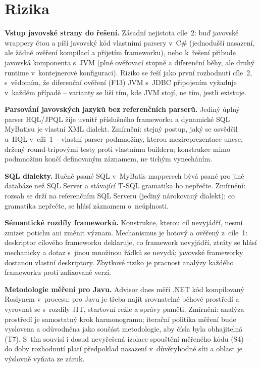 \documentclass{article}
\begin{document}
\section{Rizika}\label{sec:rizika}

\textbf{Vstup javovské strany do řešení.} Zásadní nejistota cíle~2: buď javovské wrappery čtou a píší javovský kód vlastními parsery v~C\# (jednodušší nasazení, ale žádné ověření kompilací a přijetím frameworku), nebo k~řešení přibude javovská komponenta s~JVM (plné ověřovací stupně a diferenční běhy, ale druhý runtime v~kontejnerové konfiguraci). Riziko se řeší jako první rozhodnutí cíle~2, s~vědomím, že diferenční ověření (F13) JVM s~JDBC připojením vyžaduje v~každém případě -- varianty se liší tím, kde JVM stojí, ne tím, jestli existuje.

\textbf{Parsování javovských jazyků bez referenčních parserů.} Jediný úplný parser HQL/JPQL žije uvnitř příslušného frameworku a dynamické SQL MyBatisu je vlastní XML dialekt. Zmírnění: stejný postup, jaký se osvědčil u~HQL v~cíli~1 -- vlastní parser podmnožiny, kterou mezireprezentace unese, držený round-tripovými testy proti vlastnímu builderu; konstrukce mimo podmnožinu končí definovaným záznamem, ne tichým vynecháním.

\textbf{SQL dialekty.} Ručně psané SQL v~MyBatis mapperech bývá psané pro jiné databáze než SQL Server a stávající T-SQL gramatika ho nepřečte. Zmírnění: rozsah se drží na referenčním SQL Serveru (jediný nárokovaný dialekt); co gramatika nepřečte, se hlásí záznamem o~neúplnosti.

\textbf{Sémantické rozdíly frameworků.} Konstrukce, kterou cíl nevyjádří, nesmí zmizet potichu ani změnit význam. Mechanismus je hotový a ověřený z~cíle~1: deskriptor cílového frameworku deklaruje, co framework nevyjádří, ztráty se hlásí mechanicky a dotaz s~jinou množinou řádků se nevydá; javovské frameworky dostanou vlastní deskriptory. Zbytkové riziko je pracnost analýzy každého frameworku proti zafixované verzi.

\textbf{Metodologie měření pro Javu.} Advisor dnes měří .NET kód kompilovaný Roslynem v~procesu; pro Javu je třeba najít srovnatelné běhové prostředí a vyrovnat se s~rozdíly JIT, startovní režie a správy paměti. Zmírnění: analýza prostředí je samostatný krok harmonogramu; iterační politika měření bude vyslovena a odůvodněna jako součást metodologie, aby čísla byla obhajitelná (T7). S~tím souvisí i dosud nevyřešená izolace spouštění měřeného kódu (S4) -- do doby rozhodnutí platí předpoklad nasazení v~důvěryhodné síti a oblast je výslovně vyňata ze záruk.
\end{document}
